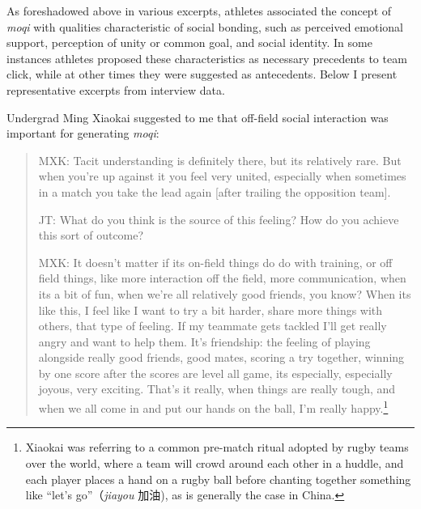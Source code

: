 \begin{CJK}{UTF8}{gbsn}



As foreshadowed above in various excerpts, athletes associated the concept of \textit{moqi} with qualities characteristic of social bonding, such as perceived emotional support, perception of unity or common goal, and social identity.  In some instances athletes proposed these characteristics as necessary precedents to team click, while at other times they were suggested as antecedents.  Below I present representative excerpts from interview data.

Undergrad Ming Xiaokai suggested to me that off-field social interaction was important for generating \textit{moqi}:

    \begin{quote}
        MXK: Tacit understanding is definitely there, but its relatively rare. But when you're up against it you feel very united, especially when sometimes in a match you take the lead again [after trailing the opposition team].

        JT: What do you think is the source of this feeling?  How do you achieve this sort of outcome?

        MXK: It doesn't matter if its on-field things do do with training, or off field things, like more interaction off the field, more communication, when its a bit of fun, when we're all relatively good friends, you know?  When its like this, I feel like I want to try a bit harder, share more things with others, that type of feeling.  If my teammate gets tackled I'll get really angry and want to help them.  It's friendship: the feeling of playing alongside really good friends, good mates, scoring a try together, winning by one score after the scores are level all game, its especially, especially joyous, very exciting.  That's it really, when things are really tough, and when we all come in and put our hands on the ball, I'm really happy.\footnote{Xiaokai was referring to a common pre-match ritual adopted by rugby teams over the world, where a team will crowd around each other in a huddle, and each player places a hand on a rugby ball before chanting together something like ``let's go''（\textit{jiayou} 加油), as is generally the case in China.}
    \end{quote}


\end{CJK}
